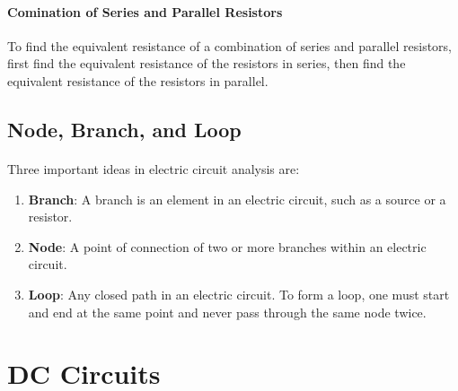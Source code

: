\documentclass[11pt]{article}
\begin{document}
\paragraph{Comination of Series and Parallel Resistors} To find the equivalent resistance of a combination of series and parallel resistors, first find the equivalent resistance of the resistors in series, then find the equivalent resistance of the resistors in parallel.
\subsection{Node, Branch, and Loop}
\paragraph{} Three important ideas in electric circuit analysis are:
\begin{enumerate}
    \item \textbf{Branch}: A branch is an element in an electric circuit, such as a source or a resistor.
    \item \textbf{Node}: A point of connection of two or more branches within an electric circuit.
    \item \textbf{Loop}: Any closed path in an electric circuit. To form a loop, one must start and end at the same point and never pass through the same node twice.
\end{enumerate}
\section{DC Circuits}
\paragraph{}
\end{document}
